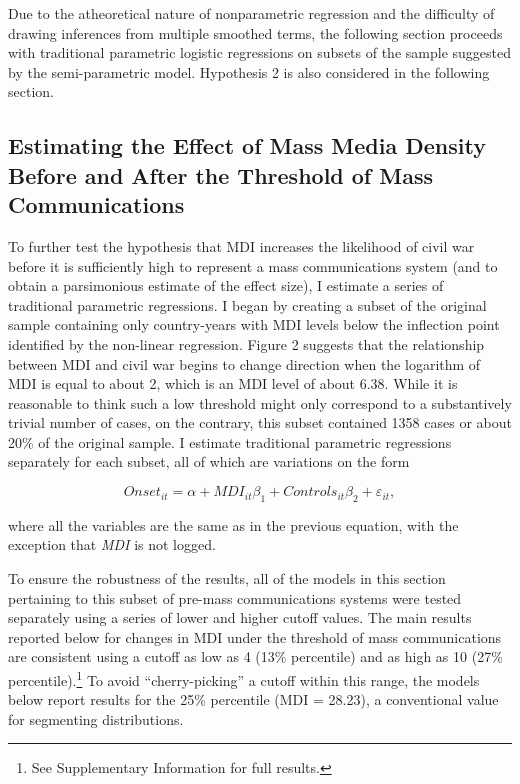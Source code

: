 \documentclass[11pt,article,oneside]{memoir}
\begin{document}
Due to the atheoretical nature of nonparametric regression and the
difficulty of drawing inferences from multiple smoothed terms, the
following section proceeds with traditional parametric logistic
regressions on subsets of the sample suggested by the semi-parametric
model. Hypothesis 2 is also considered in the following section.

\subsection{Estimating the Effect of Mass Media Density Before and After
the Threshold of Mass
Communications}\label{estimating-the-effect-of-mass-media-density-before-and-after-the-threshold-of-mass-communications}

To further test the hypothesis that MDI increases the likelihood of
civil war before it is sufficiently high to represent a mass
communications system (and to obtain a parsimonious estimate of the
effect size), I estimate a series of traditional parametric regressions.
I began by creating a subset of the original sample containing only
country-years with MDI levels below the inflection point identified by
the non-linear regression. Figure 2 suggests that the relationship
between MDI and civil war begins to change direction when the logarithm
of MDI is equal to about 2, which is an MDI level of about 6.38. While
it is reasonable to think such a low threshold might only correspond to
a substantively trivial number of cases, on the contrary, this subset
contained 1358 cases or about 20\% of the original sample. I estimate
traditional parametric regressions separately for each subset, all of
which are variations on the form

\[ Onset_{it} = \alpha + MDI_{it} \beta_1 + Controls_{it} \beta_2  + \varepsilon_{it}, \]

where all the variables are the same as in the previous equation, with
the exception that \emph{MDI} is not logged.

To ensure the robustness of the results, all of the models in this
section pertaining to this subset of pre-mass communications systems
were tested separately using a series of lower and higher cutoff values.
The main results reported below for changes in MDI under the threshold
of mass communications are consistent using a cutoff as low as 4 (13\%
percentile) and as high as 10 (27\% percentile).\footnote{See
  Supplementary Information for full results.} To avoid
``cherry-picking'' a cutoff within this range, the models below report
results for the 25\% percentile (MDI = 28.23), a conventional value for
segmenting distributions.
\end{document}
